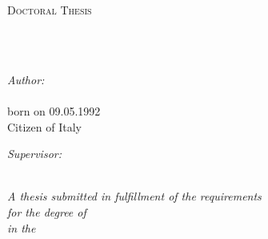 \frontmatter %

\pagestyle{plain} %


\begin{titlepage}
\begin{center}

\vspace*{.06\textheight}
{\scshape\LARGE \univname\par}\vspace{1.5cm} %
\textsc{\Large Doctoral Thesis}\\[0.5cm] %

\HRule \\[0.4cm] %
{\huge \bfseries \ttitle\par}\vspace{0.4cm} %
\HRule \\[1.5cm] %
 
\begin{minipage}[t]{0.4\textwidth}
\begin{flushleft} \large
\emph{Author:}\\
\href{}{\authorname}\\[0.3cm] %
born on 09.05.1992\\[0.2cm]
Citizen of Italy\\[0.1cm]
\end{flushleft}
\end{minipage}
\begin{minipage}[t]{0.4\textwidth}
\begin{flushright} \large
\emph{Supervisor:} \\
\href{}{\supname} %
\end{flushright}
\end{minipage}\\[2cm]
 

\large \textit{A thesis submitted in fulfillment of the requirements\\ for the degree of \degreename}\\[0.3cm] %
\textit{in the}\\[0.4cm]
\groupname\\\deptname\\[1cm] %
 

\end{center}
\end{titlepage}
